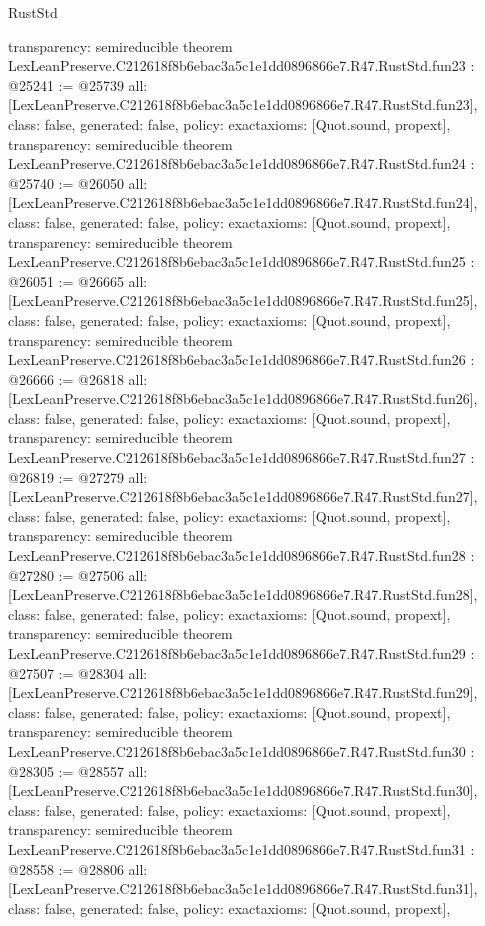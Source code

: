\begin{lexlean}{RustStd}
\begin{coremodule}
{  transparency: semireducible
}
theorem LexLeanPreserve.C212618f8b6ebac3a5c1e1dd0896866e7.R47.RustStd.fun23 : @25241 := @25739 {
  all: [LexLeanPreserve.C212618f8b6ebac3a5c1e1dd0896866e7.R47.RustStd.fun23],
  class: false,
  generated: false,
  policy: exact{axioms: [Quot.sound, propext]},
  transparency: semireducible
}
theorem LexLeanPreserve.C212618f8b6ebac3a5c1e1dd0896866e7.R47.RustStd.fun24 : @25740 := @26050 {
  all: [LexLeanPreserve.C212618f8b6ebac3a5c1e1dd0896866e7.R47.RustStd.fun24],
  class: false,
  generated: false,
  policy: exact{axioms: [Quot.sound, propext]},
  transparency: semireducible
}
theorem LexLeanPreserve.C212618f8b6ebac3a5c1e1dd0896866e7.R47.RustStd.fun25 : @26051 := @26665 {
  all: [LexLeanPreserve.C212618f8b6ebac3a5c1e1dd0896866e7.R47.RustStd.fun25],
  class: false,
  generated: false,
  policy: exact{axioms: [Quot.sound, propext]},
  transparency: semireducible
}
theorem LexLeanPreserve.C212618f8b6ebac3a5c1e1dd0896866e7.R47.RustStd.fun26 : @26666 := @26818 {
  all: [LexLeanPreserve.C212618f8b6ebac3a5c1e1dd0896866e7.R47.RustStd.fun26],
  class: false,
  generated: false,
  policy: exact{axioms: [Quot.sound, propext]},
  transparency: semireducible
}
theorem LexLeanPreserve.C212618f8b6ebac3a5c1e1dd0896866e7.R47.RustStd.fun27 : @26819 := @27279 {
  all: [LexLeanPreserve.C212618f8b6ebac3a5c1e1dd0896866e7.R47.RustStd.fun27],
  class: false,
  generated: false,
  policy: exact{axioms: [Quot.sound, propext]},
  transparency: semireducible
}
theorem LexLeanPreserve.C212618f8b6ebac3a5c1e1dd0896866e7.R47.RustStd.fun28 : @27280 := @27506 {
  all: [LexLeanPreserve.C212618f8b6ebac3a5c1e1dd0896866e7.R47.RustStd.fun28],
  class: false,
  generated: false,
  policy: exact{axioms: [Quot.sound, propext]},
  transparency: semireducible
}
theorem LexLeanPreserve.C212618f8b6ebac3a5c1e1dd0896866e7.R47.RustStd.fun29 : @27507 := @28304 {
  all: [LexLeanPreserve.C212618f8b6ebac3a5c1e1dd0896866e7.R47.RustStd.fun29],
  class: false,
  generated: false,
  policy: exact{axioms: [Quot.sound, propext]},
  transparency: semireducible
}
theorem LexLeanPreserve.C212618f8b6ebac3a5c1e1dd0896866e7.R47.RustStd.fun30 : @28305 := @28557 {
  all: [LexLeanPreserve.C212618f8b6ebac3a5c1e1dd0896866e7.R47.RustStd.fun30],
  class: false,
  generated: false,
  policy: exact{axioms: [Quot.sound, propext]},
  transparency: semireducible
}
theorem LexLeanPreserve.C212618f8b6ebac3a5c1e1dd0896866e7.R47.RustStd.fun31 : @28558 := @28806 {
  all: [LexLeanPreserve.C212618f8b6ebac3a5c1e1dd0896866e7.R47.RustStd.fun31],
  class: false,
  generated: false,
  policy: exact{axioms: [Quot.sound, propext]},
}
\end{coremodule}
\end{lexlean}
